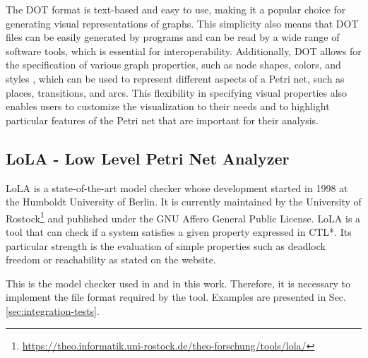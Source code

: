 The DOT format is text-based and easy to use,
making it a popular choice for generating visual representations of graphs.
This simplicity also means that DOT files can be easily generated by programs
and can be read by a wide range of software tools,
which is essential for interoperability.
Additionally, DOT allows for the specification of various graph properties,
such as node shapes, colors, and styles \cite{dot2015},
which can be used to represent different aspects of a Petri net,
such as places, transitions, and arcs.
This flexibility in specifying visual properties also enables users
to customize the visualization to their needs and
to highlight particular features of the Petri net
that are important for their analysis.

\subsection{LoLA - Low Level Petri Net Analyzer}

\acrfull{LoLA}\cite{schmidt2000lola} is a state-of-the-art model checker
whose development started in 1998 at the Humboldt University of Berlin.
It is currently maintained by the University of
Rostock\footnote{\url{https://theo.informatik.uni-rostock.de/theo-forschung/tools/lola/}}
and published under the GNU Affero General Public License.
\acrshort{LoLA} is a tool that can check
if a system satisfies a given property expressed in \acrfull{CTL*}.
Its particular strength is the evaluation of simple properties
such as deadlock freedom or reachability as stated on the website.

This is the model checker used in \cite{meyer2020} and in this work.
Therefore, it is necessary to implement the file format required by the tool.
Examples are presented in Sec. \ref{sec:integration-tests}.